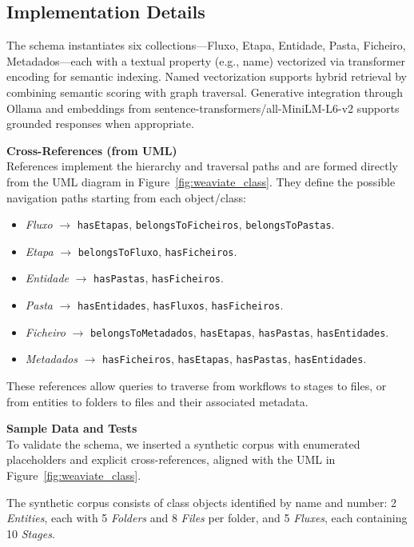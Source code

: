\subsection{Implementation Details}

The schema instantiates six collections—Fluxo, Etapa, Entidade, Pasta, Ficheiro, Metadados—each with a textual property (e.g., name) vectorized via transformer encoding for semantic indexing. Named vectorization supports hybrid retrieval by combining semantic scoring with graph traversal. Generative integration through Ollama and embeddings from sentence-transformers/all-MiniLM-L6-v2 supports grounded responses when appropriate.

\noindent\textbf{Cross-References (from UML)}\\
References implement the hierarchy and traversal paths and are formed directly from the UML diagram in Figure~\ref{fig:weaviate_class}. They define the possible navigation paths starting from each object/class:
\begin{itemize}
    \item \textit{Fluxo} \(\rightarrow\) \texttt{hasEtapas}, \texttt{belongsToFicheiros}, \texttt{belongsToPastas}.
    \item \textit{Etapa} \(\rightarrow\) \texttt{belongsToFluxo}, \texttt{hasFicheiros}.
    \item \textit{Entidade} \(\rightarrow\) \texttt{hasPastas}, \texttt{hasFicheiros}.
    \item \textit{Pasta} \(\rightarrow\) \texttt{hasEntidades}, \texttt{hasFluxos}, \texttt{hasFicheiros}.
    \item \textit{Ficheiro} \(\rightarrow\) \texttt{belongsToMetadados}, \texttt{hasEtapas}, \texttt{hasPastas}, \texttt{hasEntidades}.
    \item \textit{Metadados} \(\rightarrow\) \texttt{hasFicheiros}, \texttt{hasEtapas}, \texttt{hasPastas}, \texttt{hasEntidades}.
\end{itemize}
These references allow queries to traverse from workflows to stages to files, or from entities to folders to files and their associated metadata.

\noindent\textbf{Sample Data and Tests} \\
To validate the schema, we inserted a synthetic corpus with enumerated placeholders and explicit cross-references, aligned with the UML in Figure~\ref{fig:weaviate_class}.

The synthetic corpus consists of class objects identified by name and number: 2 \textit{Entities}, each with 5 \textit{Folders} and 8 \textit{Files} per folder, and 5 \textit{Fluxes}, each containing 10 \textit{Stages}.

